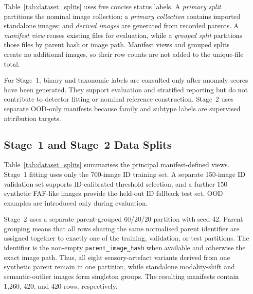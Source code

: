 \documentclass[fleqn,12pt]{olplainarticle}
\begin{document}
Table~\ref{tab:dataset_splits} uses five concise status labels. A
\emph{primary split} partitions the nominal image collection; a
\emph{primary collection} contains imported standalone images; and
\emph{derived images} are generated from recorded parents. A
\emph{manifest view} reuses existing files for evaluation, while a
\emph{grouped split} partitions those files by parent hash or image path.
Manifest views and grouped splits create no additional images, so their row
counts are not added to the unique-file total.

For Stage~1, binary and taxonomic labels are consulted only after anomaly
scores have been generated. They support evaluation and stratified reporting
but do not contribute to detector fitting or nominal reference construction.
Stage~2 uses separate OOD-only manifests because family and subtype labels are
supervised attribution targets.

\subsection{Stage~1 and Stage~2 Data Splits}
\label{subsec:dataset_splits}

Table~\ref{tab:dataset_splits} summarises the principal manifest-defined
views. Stage~1 fitting uses only the 700-image ID training set. A separate
150-image ID validation set supports ID-calibrated threshold selection, and a
further 150 synthetic FAF-like images provide the held-out ID fallback test
set. OOD examples are introduced only during evaluation.

Stage~2 uses a separate parent-grouped 60/20/20 partition with seed 42.
Parent grouping means that all rows sharing the same normalised parent
identifier are assigned together to exactly one of the training, validation,
or test partitions. The identifier is the non-empty
\texttt{parent\_image\_\allowbreak hash} when available and otherwise the exact
image path. Thus, all eight sensory-artefact variants derived from one
synthetic parent remain in one partition, while standalone modality-shift and
semantic-outlier images form singleton groups. The resulting manifests contain
1,260, 420, and 420 rows, respectively.
\end{document}

